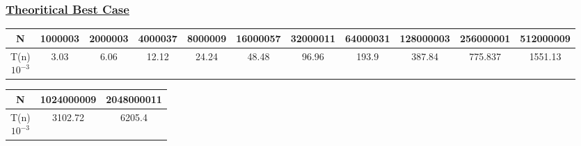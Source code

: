 \subsubsection*{\underline{Theoritical Best Case}}

\begin{tabular}{|c|c|c|c|c|c|c|c|c|c|c|}
\hline
N & 1000003 & 2000003 & 4000037 & 8000009 & 16000057 & 32000011 & 64000031 & 128000003 & 256000001 & 512000009 \\
\hline
\makecell{T(n)\\\(10^{-3}\)} & 3.03 & 6.06 & 12.12 & 24.24 & 48.48 & 96.96 & 193.9 & 387.84 & 775.837 & 1551.13\\
\hline
\end{tabular}

\vspace{0.25cm}

\begin{tabular}{|c|c|c|}
    \hline
    N & 1024000009 & 2048000011\\
    \hline
    \makecell{T(n)\\\(10^{-3}\)}  & 3102.72 & 6205.4\\
    \hline
\end{tabular}


